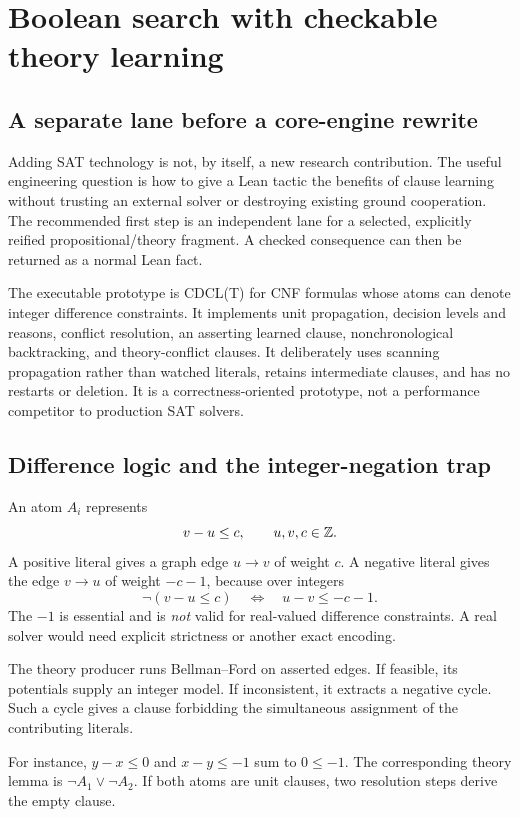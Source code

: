\documentclass[11pt,letterpaper]{article}
\theoremstyle{definition}\newtheorem{definition}[theorem]{Definition}
\theoremstyle{remark}\newtheorem{remark}[theorem]{Remark}
\begin{document}
\section{Boolean search with checkable theory learning}
\subsection{A separate lane before a core-engine rewrite}
Adding SAT technology is not, by itself, a new research contribution. The useful engineering question is how to give a Lean tactic the benefits of clause learning without trusting an external solver or destroying existing ground cooperation. The recommended first step is an independent lane for a selected, explicitly reified propositional/theory fragment. A checked consequence can then be returned as a normal Lean fact.

The executable prototype is CDCL(T) for CNF formulas whose atoms can denote integer difference constraints. It implements unit propagation, decision levels and reasons, conflict resolution, an asserting learned clause, nonchronological backtracking, and theory-conflict clauses. It deliberately uses scanning propagation rather than watched literals, retains intermediate clauses, and has no restarts or deletion. It is a correctness-oriented prototype, not a performance competitor to production SAT solvers.

\subsection{Difference logic and the integer-negation trap}
An atom $A_i$ represents
\[
 v-u\le c,\qquad u,v,c\in\mathbb{Z}.
\]
A positive literal gives a graph edge $u\to v$ of weight $c$. A negative literal gives the edge $v\to u$ of weight $-c-1$, because over integers
\[
 \neg(v-u\le c)\quad\Longleftrightarrow\quad u-v\le -c-1.
\]
The $-1$ is essential and is \emph{not} valid for real-valued difference constraints. A real solver would need explicit strictness or another exact encoding.

The theory producer runs Bellman--Ford on asserted edges. If feasible, its potentials supply an integer model. If inconsistent, it extracts a negative cycle. Such a cycle gives a clause forbidding the simultaneous assignment of the contributing literals.

For instance, $y-x\le0$ and $x-y\le-1$ sum to $0\le-1$. The corresponding theory lemma is $\neg A_1\lor\neg A_2$. If both atoms are unit clauses, two resolution steps derive the empty clause.
\end{document}
